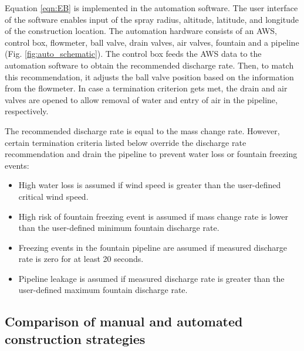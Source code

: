 Equation \ref{eqn:EB} is implemented in the automation software. The user interface of the software enables
input of the spray radius, altitude, latitude, and longitude of the construction location. The automation
hardware consists of an AWS, control box, flowmeter, ball valve, drain valves, air valves, fountain and a
pipeline (Fig. \ref{fig:auto_schematic}). The control box feeds the AWS data to the automation software to
obtain the recommended discharge rate. Then, to match this recommendation, it adjusts the ball valve position
based on the information from the flowmeter. In case a termination criterion gets met, the drain and air valves
are opened to allow removal of water and entry of air in the pipeline, respectively.

The recommended discharge rate is equal to the mass change rate. However, certain termination criteria listed
below override the discharge rate recommendation and drain the pipeline to prevent water loss or fountain
freezing events:

\begin{itemize}

	\item High water loss is assumed if wind speed is greater than the user-defined critical wind speed.

	\item High risk of fountain freezing event is assumed if mass change rate is lower than the user-defined minimum fountain discharge rate.

	\item Freezing events in the fountain pipeline are assumed if measured discharge rate is zero for at least 20
	      seconds.

	\item Pipeline leakage is assumed if measured discharge rate is greater than the user-defined maximum fountain discharge rate.

\end{itemize}

\subsection{Comparison of manual and automated construction strategies}

